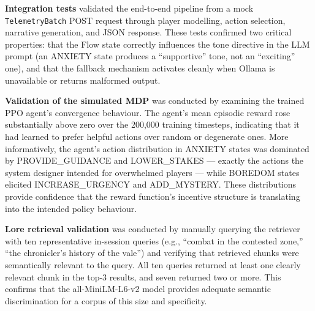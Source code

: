 \textbf{Integration tests} validated the end-to-end pipeline from a mock \texttt{TelemetryBatch} POST request through player modelling, action selection, narrative generation, and JSON response. These tests confirmed two critical properties: that the Flow state correctly influences the tone directive in the LLM prompt (an ANXIETY state produces a ``supportive'' tone, not an ``exciting'' one), and that the fallback mechanism activates cleanly when Ollama is unavailable or returns malformed output.

\textbf{Validation of the simulated MDP} was conducted by examining the trained PPO agent's convergence behaviour. The agent's mean episodic reward rose substantially above zero over the 200,000 training timesteps, indicating that it had learned to prefer helpful actions over random or degenerate ones. More informatively, the agent's action distribution in ANXIETY states was dominated by PROVIDE\_GUIDANCE and LOWER\_STAKES --- exactly the actions the system designer intended for overwhelmed players --- while BOREDOM states elicited INCREASE\_URGENCY and ADD\_MYSTERY. These distributions provide confidence that the reward function's incentive structure is translating into the intended policy behaviour.

\textbf{Lore retrieval validation} was conducted by manually querying the retriever with ten representative in-session queries (e.g., ``combat in the contested zone,'' ``the chronicler's history of the vale'') and verifying that retrieved chunks were semantically relevant to the query. All ten queries returned at least one clearly relevant chunk in the top-3 results, and seven returned two or more. This confirms that the all-MiniLM-L6-v2 model provides adequate semantic discrimination for a corpus of this size and specificity.
